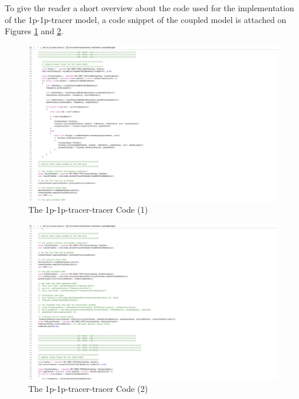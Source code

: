To give the reader a short overview about the code used for the implementation of the 1p-1p-tracer model, a code snippet of the coupled model is attached on Figures \ref{fig:1p-1p-tracer-tracer-1} and \ref{fig:1p-1p-tracer-tracer-2}. %
\begin{figure}[h]
\centering
\includegraphics[width=350mm]{1p_1p_tracer_tracer_1}
\caption{\footnotesize The 1p-1p-tracer-tracer Code (1)}
\label{fig:1p-1p-tracer-tracer-1}
\end{figure}
\begin{figure}[h]
\centering
\includegraphics[width=350mm]{1p_1p_tracer_tracer_2}
\caption{\footnotesize The 1p-1p-tracer-tracer Code (2)}
\label{fig:1p-1p-tracer-tracer-2}
\end{figure}

